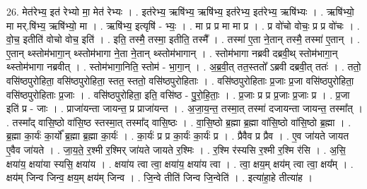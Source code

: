 \documentclass[17pt]{extarticle}
\begin{document}
26. मेत॑रेभ्य॒ इत॑ रेभ्यो मा॒ मेत॑ रेभ्यः । . इत॑रेभ्य॒ ऋषि॑भ्य॒ ऋषि॑भ्य॒ इत॑रेभ्य॒ इत॑रेभ्य॒ ऋषि॑भ्यः । . ऋषि॑भ्यो॒ मा मर्.षि॑भ्य॒ ऋषि॑भ्यो॒ मा । . ऋषि॑भ्य॒ इत्यृषि॑ - भ्यः॒ । . मा प्र प्र मा मा प्र । . प्र वो॑चो वोचः॒ प्र प्र वो॑चः । . वो॒च॒ इतीति॑ वोचो वोच॒ इति॑ । . इति॒ तस्मै॒ तस्मा॒ इतीति॒ तस्मै᳚ । . तस्मा॑ ए॒ता ने॒तान् तस्मै॒ तस्मा॑ ए॒तान् । . ए॒तान् थ्स्तोम॑भागा॒न् थ्स्तोम॑भागा ने॒ता ने॒तान् थ्स्तोम॑भागान् । . स्तोम॑भागा नब्रवी दब्रवी॒थ् स्तोम॑भागा॒न् थ्स्तोम॑भागा नब्रवीत् । . स्तोम॑भागा॒निति॒ स्तोम॑ - भा॒गा॒न् । . अ॒ब्र॒वी॒त् तत॒स्ततो᳚ ऽब्रवी दब्रवी॒त् ततः॑ । . ततो॒ वसि॑ष्ठपुरोहिता॒ वसि॑ष्ठपुरोहिता॒ स्तत॒ स्ततो॒ वसि॑ष्ठपुरोहिताः । . वसि॑ष्ठपुरोहिताः प्र॒जाः प्र॒जा वसि॑ष्ठपुरोहिता॒ वसि॑ष्ठपुरोहिताः प्र॒जाः । . वसि॑ष्ठपुरोहिता॒ इति॒ वसि॑ष्ठ - पु॒रो॒हि॒ताः॒ । . प्र॒जाः प्र प्र प्र॒जाः प्र॒जाः प्र । . प्र॒जा इति॑ प्र - जाः । . प्राजा॑यन्ता जायन्त॒ प्र प्राजा॑यन्त । . अ॒जा॒य॒न्त॒ तस्मा॒त् तस्मा॑ दजायन्ता जायन्त॒ तस्मा᳚त् । . तस्मा᳚द् वासि॒ष्ठो वा॑सि॒ष्ठ स्तस्मा॒त् तस्मा᳚द् वासि॒ष्ठः । . वा॒सि॒ष्ठो ब्र॒ह्मा ब्र॒ह्मा वा॑सि॒ष्ठो वा॑सि॒ष्ठो ब्र॒ह्मा । . ब्र॒ह्मा का॒र्यः॑ का॒र्यो᳚ ब्र॒ह्मा ब्र॒ह्मा का॒र्यः॑ । . का॒र्यः॑ प्र प्र का॒र्यः॑ का॒र्यः॑ प्र । . प्रैवैव प्र प्रैव । . ए॒व जा॑यते जायत ए॒वैव जा॑यते । . जा॒य॒ते॒ र॒श्मी र॒श्मिर् जा॑यते जायते र॒श्मिः । . र॒श्मि र॑स्यसि र॒श्मी र॒श्मि र॑सि । . अ॒सि॒ क्षया॑य॒ क्षया॑या स्यसि॒ क्षया॑य । . क्षया॑य त्वा त्वा॒ क्षया॑य॒ क्षया॑य त्वा । . त्वा॒ क्षय॒म् क्षय॑म् त्वा त्वा॒ क्षय᳚म् । . क्षय॑म् जिन्व जिन्व॒ क्षय॒म् क्षय॑म् जिन्व । . जि॒न्वे तीति॑ जिन्व जि॒न्वेति॑ । . इत्या॑हा॒हे तीत्या॑ह । \newline
\end{document}
